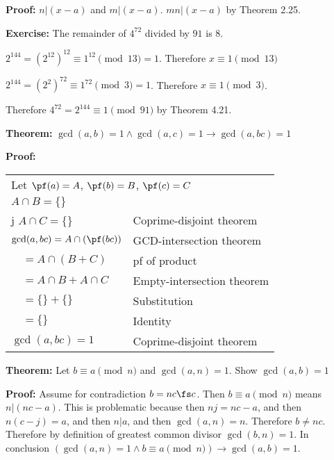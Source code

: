 \textbf{Proof:} \(n|(x-a)\) and \(m|(x-a)\). \(mn|(x-a)\) by Theorem 2.25. \qedhere

\item \textbf{Exercise:} The remainder of \(4^{72}\) divided by \(91\) is 8.

\(2^{144} = (2^{12})^{12} \equiv 1^{12} \pmod {13} = 1\). Therefore \(x \equiv 1 \pmod {13}\)

\(2^{144} = (2^{2})^{72} \equiv 1^{72} \pmod 3 = 1\). Therefore \(x \equiv 1 \pmod 3\).

Therefore \(4^{72} = 2^{144} \equiv 1 \pmod {91}\) by Theorem 4.21.


\setcounter{enumii}{27}

\item \textbf{Theorem:} \(\gcd(a, b) = 1 \wedge \gcd(a, c) = 1 \rightarrow \gcd(a, bc) = 1\)

\textbf{Proof:}

\begin{tabular}[t]{ll}
\multicolumn{2}{l}{Let \(\pf(a) = A\), \(\pf(b) = B\), \(\pf(c) = C\)} \\
\(A \cap B = \{\}\) \\ j 
\(A \cap C = \{\}\) & Coprime-disjoint theorem \\
\(\gcd(a, bc) = A \cap (\pf(bc))\) & GCD-intersection theorem \\
\(\quad = A \cap (B + C)\) & pf of product \\
\(\quad = A \cap B + A \cap C\) & Empty-intersection theorem \\
\(\quad = \{\} + \{\}\) & Substitution \\
\(\quad = \{\}\) & Identity \\
\(\gcd(a, bc) = 1\) & Coprime-disjoint theorem \qedhere
\end{tabular}

\item \textbf{Theorem:} Let \(b \equiv a \pmod n\) and \(\gcd(a, n) = 1\). Show \(\gcd(a, b) = 1\)

\textbf{Proof:} Assume for contradiction \(b = n c \fs c\). Then \(b \equiv a \pmod n\) means \(n | (nc - a)\). This is problematic because then \(nj = nc - a\), and then \(n(c-j) = a\), and then \(n|a\), and then \(\gcd(a, n) = n\). Therefore \(b \neq nc\). Therefore by definition of greatest common divisor \(\gcd(b, n) = 1\). In conclusion \((\gcd(a, n) = 1 \wedge b \equiv a \pmod n) \rightarrow \gcd(a, b) = 1\). \qedhere

